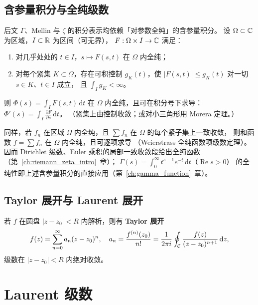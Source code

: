 \subsection{含参量积分与全纯级数}
\label{sec:param_integral}

后文 $\Gamma$、Mellin 与 $\zeta$ 的积分表示均依赖「对参数全纯」的含参量积分。
\label{thm:param_integral}
设 $\Omega\subset\mathbb{C}$ 为区域，$I\subset\mathbb{R}$ 为区间（可无界），
$F:\Omega\times I\to\mathbb{C}$ 满足：
\begin{enumerate}
  \item 对几乎处处的 $t\in I$，$s\mapsto F(s,t)$ 在 $\Omega$ 内全纯；
  \item 对每个紧集 $K\subset\Omega$，存在可积控制 $g_K(t)$，使
        $|F(s,t)|\le g_K(t)$ 对一切 $s\in K$、$t\in I$ 成立，
        且 $\int_I g_K<\infty$。
\end{enumerate}
则 $\Phi(s)=\int_I F(s,t)\,\mathrm{d}t$ 在 $\Omega$ 内全纯，且可在积分号下求导：
$\Phi'(s)=\int_I \frac{\partial F}{\partial s}\,\mathrm{d}t$。
（紧集上由控制收敛；或对小三角形用 Morera 定理。）

\label{thm:weierstrass_series}
同样，若 $f_n$ 在区域 $\Omega$ 内全纯，且 $\sum f_n$ 在 $\Omega$ 的每个紧子集上一致收敛，
则和函数 $f=\sum f_n$ 在 $\Omega$ 内全纯，且可逐项求导
（Weierstrass 全纯函数项级数定理）。
因而 Dirichlet 级数、Euler 乘积的局部一致收敛段给出全纯函数
（第~\ref{ch:riemann_zeta_intro}~章）；
$\Gamma(s)=\int_0^\infty t^{s-1}e^{-t}\,\mathrm{d}t$（$\operatorname{Re}s>0$）
的全纯性即上述含参量积分的直接应用（第~\ref{ch:gamma_function}~章）。

\subsection{Taylor 展开与 Laurent 展开}

若 $f$ 在圆盘 $|z-z_0|<R$ 内解析，则有 \textbf{Taylor 展开}
\begin{equation}
  f(z) = \sum_{n=0}^\infty a_n(z-z_0)^n,
  \quad a_n = \frac{f^{(n)}(z_0)}{n!}
  = \frac{1}{2\pi i}\oint_{\mathcal{C}}\frac{f(z)}{(z-z_0)^{n+1}}\,\mathrm{d} z,
  \label{eq:taylor}
\end{equation}
级数在 $|z-z_0|<R$ 内绝对收敛。

\section{Laurent 级数}

